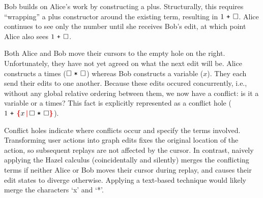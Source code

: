 \documentclass[nonacm, acmsmall, screen, review]{acmart}
\newcommand{\id}[1]{\textcolor{gray}{\ensuremath{#1}}}
\newcommand{\eid}[2]{{#2}^{\id{#1}}}
\newcommand{\hole}{\ensuremath{\square}} %
\newcommand{\conflictHole}[1]{%
{\noexpandarg\StrSubstitute{#1}{,}{\textcolor{red}{\,\textbf{|}\,}}[\myargs]%
{\textcolor{red}{\textbf{\{}}\myargs\textcolor{red}{\textbf{\}}}}}}%
\newcommand{\ePlus}[3]{#2~\eid{#1}{\texttt{+}}~#3}
\newcommand{\eTimes}[3]{#2~\eid{#1}{\texttt{*}}~#3}
\begin{document}
Bob builds on Alice's work by constructing a plus.
Structurally, this requires ``wrapping'' a plus constructor around the existing term, resulting in $\ePlus{}{1}{\hole}$.
Alice continues to see only the number until she receives Bob's edit,
at which point Alice also sees $\ePlus{}{1}{\hole}$.





Both Alice and Bob move their cursors to the empty hole on the right.
Unfortunately, they have not yet agreed on what the next edit will be.
Alice constructs a times ($\eTimes{}{\hole}{\hole}$) whereas Bob constructs a variable ($x$).
They each send their edits to one another.
Because these edits occured concurrently, i.e., without any global relative ordering between them, we now have a conflict: is it a variable or a times?
This fact is explicitly represented as a conflict hole ($\ePlus{}{1}{\conflictHole{x, \eTimes{}{\hole}{\hole}}}$).

Conflict holes indicate where conflicts occur and specify the terms involved.
Transforming user actions into graph edits fixes the original location of the action, so subsequent replays are not affected by the cursor.
In contrast, naively applying the Hazel calculus (coincidentally and silently) merges the conflicting terms if neither Alice or Bob moves their cursor during replay, 
and causes their edit states to diverge otherwise.
Applying a text-based technique would likely merge the characters `x' and `*'.
\end{document}
